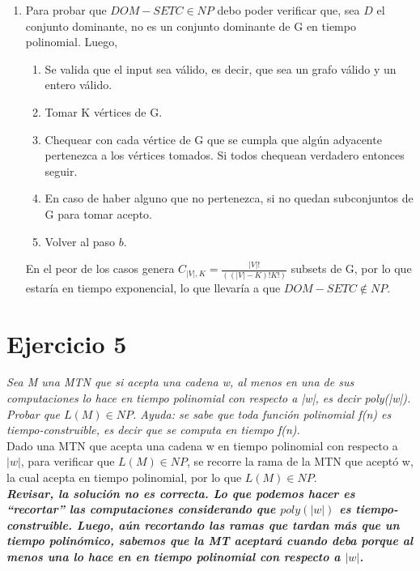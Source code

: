 \documentclass[lnbip]{svmultln}
\begin{document}
\begin{enumerate}
    \item Para probar que $DOM-SETC \in NP$ debo poder verificar que, sea $D$ el conjunto dominante, no es un conjunto dominante de G en tiempo polinomial. Luego, \\
    
    \begin{enumerate}
        \item Se valida que el input sea válido, es decir, que sea un grafo válido y un entero válido.
        \item Tomar K vértices de G. 
        \item Chequear con cada vértice de G que se cumpla que algún adyacente pertenezca a los vértices tomados. Si todos chequean verdadero entonces seguir.  
        \item En caso de haber alguno que no pertenezca, si no quedan subconjuntos de G para tomar acepto. 
        \item Volver al paso $b$.
        
    \end{enumerate}
    
    En el peor de los casos genera $C_{|V|, K} = \frac{|V|!}{((|V|-K)!K!)}$ subsets de G, por lo que estaría en tiempo exponencial, lo que llevaría a que $DOM-SETC \notin NP$.
\end{enumerate}


\section{Ejercicio 5} 

\textit{Sea M una MTN que si acepta una cadena w, al menos en una de sus computaciones lo hace en tiempo polinomial con respecto a |w|, es decir poly(|w|). Probar que $L(M) \in NP$. Ayuda: se sabe que toda función polinomial f(n) es tiempo-construible, es decir que se computa en tiempo f(n).} \\

Dado una MTN que acepta una cadena w en tiempo polinomial con respecto a $|w|$, para verificar que $L(M) \in NP$, se recorre la rama de la MTN que aceptó w, la cual acepta en tiempo polinomial, por lo que $L(M) \in NP$. \\

\textbf{\textit{Revisar, la solución no es correcta. Lo que podemos hacer es “recortar” las computaciones considerando que $poly(|w|)$ es tiempo-construible. Luego, aún recortando las ramas que tardan más que un tiempo polinómico, sabemos que la MT aceptará cuando deba porque al menos una lo hace en en tiempo polinomial con respecto a $|w|$.}} \\
\end{document}
